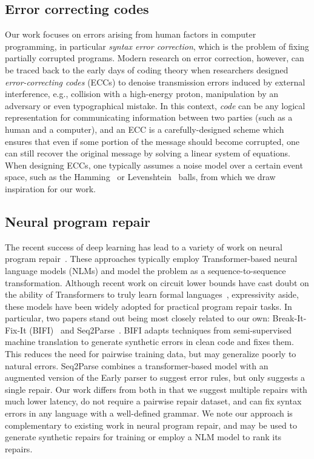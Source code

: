 \documentclass[sigplan,review,anonymous,acmsmall]{acmart}\settopmatter{printfolios=false,printccs=false,printacmref=false}
\begin{document}
\subsection{Error correcting codes}

Our work focuses on errors arising from human factors in computer programming, in particular \textit{syntax error correction}, which is the problem of fixing partially corrupted programs. Modern research on error correction, however, can be traced back to the early days of coding theory when researchers designed \textit{error-correcting codes} (ECCs) to denoise transmission errors induced by external interference, e.g., collision with a high-energy proton, manipulation by an adversary or even typographical mistake. In this context, \textit{code} can be any logical representation for communicating information between two parties (such as a human and a computer), and an ECC is a carefully-designed scheme which ensures that even if some portion of the message should become corrupted, one can still recover the original message by solving a linear system of equations. When designing ECCs, one typically assumes a noise model over a certain event space, such as the Hamming~\cite{titsias2017hamming, dong2023number} or Levenshtein~\cite{becerra2008learning, barlev2021levenshtein} balls, from which we draw inspiration for our work.

\subsection{Neural program repair}

The recent success of deep learning has lead to a variety of work on neural program repair~\cite{allamanis2021self, chirkova2021empirical, drain2021generating}. These approaches typically employ Transformer-based neural language models (NLMs) and model the problem as a sequence-to-sequence transformation. Although recent work on circuit lower bounds have cast doubt on the ability of Transformers to truly learn formal languages~\cite{merrill2022saturated, chiang2023tighter}, expressivity aside, these models have been widely adopted for practical program repair tasks. In particular, two papers stand out being most closely related to our own: Break-It-Fix-It (BIFI)~\cite{yasunaga2021break} and Seq2Parse~\cite{sakkas2022seq2parse}. BIFI adapts techniques from semi-supervised machine translation to generate synthetic errors in clean code and fixes them. This reduces the need for pairwise training data, but may generalize poorly to natural errors. Seq2Parse combines a transformer-based model with an augmented version of the Early parser to suggest error rules, but only suggests a single repair. Our work differs from both in that we suggest multiple repairs with much lower latency, do not require a pairwise repair dataset, and can fix syntax errors in any language with a well-defined grammar. We note our approach is complementary to existing work in neural program repair, and may be used to generate synthetic repairs for training or employ a NLM model to rank its repairs.
\end{document}
